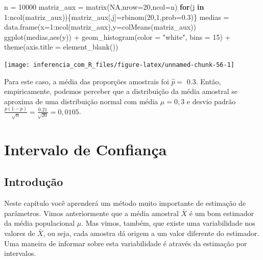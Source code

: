 \documentclass[
]{book}
\newenvironment{Shaded}{\begin{snugshade}}{\end{snugshade}}
\newcommand{\AttributeTok}[1]{\textcolor[rgb]{0.77,0.63,0.00}{#1}}
\newcommand{\ConstantTok}[1]{\textcolor[rgb]{0.00,0.00,0.00}{#1}}
\newcommand{\ControlFlowTok}[1]{\textcolor[rgb]{0.13,0.29,0.53}{\textbf{#1}}}
\newcommand{\DecValTok}[1]{\textcolor[rgb]{0.00,0.00,0.81}{#1}}
\newcommand{\FloatTok}[1]{\textcolor[rgb]{0.00,0.00,0.81}{#1}}
\newcommand{\FunctionTok}[1]{\textcolor[rgb]{0.00,0.00,0.00}{#1}}
\newcommand{\NormalTok}[1]{#1}
\newcommand{\OtherTok}[1]{\textcolor[rgb]{0.56,0.35,0.01}{#1}}
\newcommand{\SpecialCharTok}[1]{\textcolor[rgb]{0.00,0.00,0.00}{#1}}
\newcommand{\StringTok}[1]{\textcolor[rgb]{0.31,0.60,0.02}{#1}}
\begin{document}
\begin{Shaded}
\begin{Highlighting}[]
\NormalTok{n }\OtherTok{=} \DecValTok{10000}
\NormalTok{matriz\_aux }\OtherTok{=} \FunctionTok{matrix}\NormalTok{(}\ConstantTok{NA}\NormalTok{,}\AttributeTok{nrow=}\DecValTok{20}\NormalTok{,}\AttributeTok{ncol=}\NormalTok{n)}
\ControlFlowTok{for}\NormalTok{(j }\ControlFlowTok{in} \DecValTok{1}\SpecialCharTok{:}\FunctionTok{ncol}\NormalTok{(matriz\_aux))\{matriz\_aux[,j]}\OtherTok{=}\FunctionTok{rbinom}\NormalTok{(}\DecValTok{20}\NormalTok{,}\DecValTok{1}\NormalTok{,}\AttributeTok{prob=}\FloatTok{0.3}\NormalTok{)\}}
\NormalTok{medias }\OtherTok{=} \FunctionTok{data.frame}\NormalTok{(}\AttributeTok{x=}\DecValTok{1}\SpecialCharTok{:}\FunctionTok{ncol}\NormalTok{(matriz\_aux),}\AttributeTok{y=}\FunctionTok{colMeans}\NormalTok{(matriz\_aux))}
\FunctionTok{ggplot}\NormalTok{(medias,}\FunctionTok{aes}\NormalTok{(y)) }\SpecialCharTok{+}
  \FunctionTok{geom\_histogram}\NormalTok{(}\AttributeTok{color =} \StringTok{"white"}\NormalTok{, }\AttributeTok{bins =} \DecValTok{15}\NormalTok{) }\SpecialCharTok{+}
  \FunctionTok{theme}\NormalTok{(}\AttributeTok{axis.title =} \FunctionTok{element\_blank}\NormalTok{())}
\end{Highlighting}
\end{Shaded}

\begin{center}\texttt{[image: inferencia\_com\_R\_files/figure-latex/unnamed-chunk-56-1]} \end{center}

Para este caso, a média das proporções amostrais foi \(\hat p=\) 0.3. Então, empiricamente, podemos perceber que a distribuição da média amostral se aproxima de uma distribuição normal com média \(\mu=0,3\) e desvio padrão \(\frac{p(1-p)}{\sqrt{n}}=\frac{0.21}{\sqrt{20}}=0,0105\).

\hypertarget{intervalo-de-confianuxe7a}{%
\chapter{Intervalo de Confiança}\label{intervalo-de-confianuxe7a}}

\hypertarget{introduuxe7uxe3o-4}{%
\section{Introdução}\label{introduuxe7uxe3o-4}}

Neste capítulo você aprenderá um método muito importante de estimação de parâmetros. Vimos anteriormente que a média amostral \(\bar X\) é um bom estimador da média populacional \(\mu\). Mas vimos, também, que existe uma variabilidade nos valores de \(\bar X\), ou seja, cada amostra dá origem a um valor diferente do estimador. Uma maneira de informar sobre esta variabilidade é através da estimação por intervalos.
\end{document}
